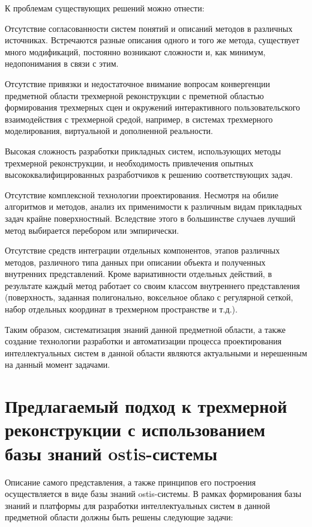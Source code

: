 К проблемам существующих решений можно отнести:
\begin{textitemize}
    \item Отсутствие согласованности систем понятий и описаний методов в различных источниках. Встречаются разные описания одного и того же метода, существует много модификаций, постоянно возникают сложности и, как минимум, недопонимания в связи с этим.
    \item Отсутствие привязки и недостаточное внимание вопросам конвергенции предметной области трехмерной реконструкции с преметной областью формирования трехмерных сцен и окружений интерактивного пользовательского взаимодействия с трехмерной средой, например, в системах трехмерного моделирования, виртуальной и дополненной реальности.
    \item Высокая сложность разработки прикладных систем, использующих методы трехмерной реконструкции, и необходимость привлечения опытных высококвалифицированных разработчиков к решению соответствующих задач.
    \item Отсутствие комплексной технологии проектирования. Несмотря на обилие алгоритмов и методов, анализ их применимости к различным видам прикладных задач крайне поверхностный. Вследствие этого в большинстве случаев лучший метод выбирается перебором или эмпирически.
    \item Отсутствие средств интеграции отдельных компонентов, этапов различных методов, различного типа данных при описании объекта и полученных внутренних представлений. Кроме вариативности отдельных действий, в результате каждый метод работает со своим классом внутреннего представления (поверхность, заданная полигонально, воксельное облако с регулярной сеткой, набор отдельных координат в трехмерном пространстве и т.д.).
\end{textitemize}

Таким образом, систематизация знаний данной предметной области, а также создание технологии разработки и автоматизации процесса проектирования интеллектуальных систем в данной области являются актуальными и нерешенным на данный момент задачами.

\section{Предлагаемый подход к трехмерной реконструкции с использованием базы знаний ostis-системы}
\label{sec_3d_models_approach}

Описание самого представления, а также принципов его построения осуществляется в виде базы знаний ostis-системы. В рамках формирования базы знаний и платформы для разработки интеллектуальных систем в данной предметной области должны быть решены следующие задачи:

